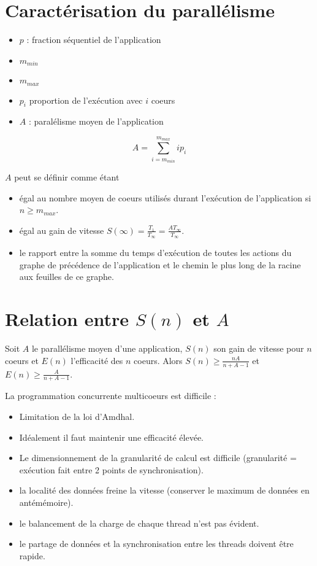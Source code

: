\documentclass[11pt,a4paper]{report}
\begin{document}
\section{Caractérisation du parallélisme} %
\label{sec:Caractérisation du parallélisme}

\begin{itemize}
    \item $p$ : fraction séquentiel de l'application
    \item $m_{min}$
    \item $m_{max}$
    \item $p_i$ proportion de l'exécution avec $i$ coeurs
    \item $A$ : paralélisme moyen de l'application 
\end{itemize}

$$A = \sum^{m_{max}}_{i=m_{min}}i p_i$$

$A$ peut se définir comme étant
\begin{itemize}
    \item égal au nombre moyen de coeurs utilisés durant l'exécution de l'application si $n \geq
        m_{max}$.
    \item égal au gain de vitesse $S(\infty)=\frac{T_1}{T_{\infty}}=\frac{A
        T{_\infty}}{T_{\infty}}$.
    \item le rapport entre la somme du temps d'exécution de toutes les actions du graphe de
        précédence de l'application et le chemin le plus long de la racine aux feuilles de ce
        graphe.
\end{itemize}

\section{Relation entre $S(n)$ et $A$} %
\label{sec:Relation entre $S(n)$ et $A$}

Soit $A$ le parallélisme moyen d'une application, $S(n)$ son gain de vitesse pour $n$ coeurs et $E(n)$ l'efficacité des $n$ coeurs. Alors $S(n) \geq \frac{nA}{n+A-1}$ et $E(n) \geq \frac{A}{n+A-1}$.


La programmation concurrente multicoeurs est difficile :
\begin{itemize}
    \item Limitation de la loi d'Amdhal.
    \item Idéalement il faut maintenir une efficacité élevée.
    \item Le dimensionnement de la granularité de calcul est difficile (granularité = exécution fait
        entre 2 points de synchronisation).
    \item la localité des données freine la vitesse (conserver le maximum de données en
        antémémoire).
    \item le balancement de la charge de chaque thread n'est pas évident.
    \item le partage de données et la synchronisation entre les threads doivent être rapide.
\end{itemize}
\end{document}
